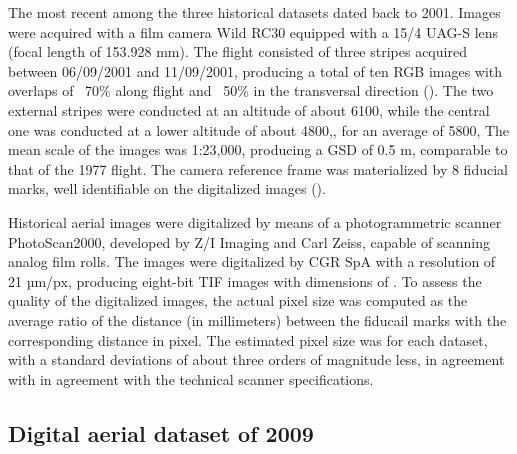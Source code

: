 The most recent among the three historical datasets dated back to 2001. Images were
acquired with a film camera Wild RC30 equipped with a 15/4 UAG-S lens (focal length
of 153.928 mm). The flight consisted of three stripes acquired between 06/09/2001 and
11/09/2001, producing a total of ten RGB images with overlaps of ~70\% along flight and
~50\% in the transversal direction (). The two external stripes were conducted at an
altitude of about \SI{6100}{\masl}, while the central one was conducted at a lower altitude of
about \SI{4800}{\masl},, for an average of \SI{5800}{\masl}, The mean scale of the images was 1:23,000, producing a GSD of 0.5 m, comparable to that of the 1977 flight. 
The camera reference frame was materialized by 8 fiducial marks, well identifiable on the digitalized images ().

Historical aerial images were digitalized by means of a photogrammetric scanner PhotoScan2000, developed by Z/I Imaging and Carl Zeiss, capable of scanning analog film rolls. 
The images were digitalized by CGR SpA with a resolution of 21 µm/px, producing eight-bit TIF 
images with dimensions of . 
To assess the quality of the digitalized images, the actual pixel size was computed as the average ratio of the distance (in millimeters) between the fiducail marks with the corresponding distance in pixel. The estimated pixel size was  for each dataset, with a standard deviations of about three orders of magnitude less, in agreement with in agreement with the technical scanner specifications.

\subsection{Digital aerial dataset of 2009}

